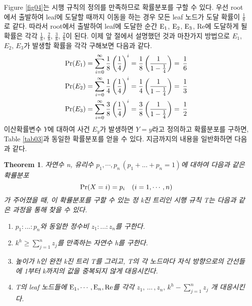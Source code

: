 \documentclass[11pt]{article}
\newtheorem{theorem}{Theorem}
\begin{document}
Figure \ref{fig04}는 시행 규칙의 정의를 만족하므로 확률분포를 구할 수 있다. 우선 root에서 출발하여 leaf에 도달할 때까지 이동을 하는 경우 모든 leaf 노드가 도달 확률이 $\frac{1}{8}$로 같다. 따라서 root에서 출발하여 leaf에 도달한 순간 $\textnormal{E}_{1}$, $\textnormal{E}_{2}$, $\textnormal{E}_{3}$, Re에 도달하게 될 확률은 각각 $\frac{1}{8}$, $\frac{2}{8}$, $\frac{3}{8}$, $\frac{2}{8}$이 된다. 이제 앞 절에서 설명했던 것과 마찬가지 방법으로 $E_{1}$, $E_{2}$, $E_{3}$가 발생할 확률을 각각 구해보면 다음과 같다.
\[
\begin{split}
\textnormal{Pr}(E_{1}) & = \sum_{i=0}^{\infty} \frac{1}{8}\left(\frac{1}{4}\right)^i = \frac{1}{8}\left(\frac{1}{1 - \frac{1}{4}}\right) = \,\frac{1}{6}\\
\textnormal{Pr}(E_{2}) & = \sum_{i=0}^{\infty} \frac{1}{4}\left(\frac{1}{4}\right)^i = \frac{1}{4}\left(\frac{1}{1 - \frac{1}{4}}\right) = \,\frac{1}{3}\\
\textnormal{Pr}(E_{3}) & = \sum_{i=0}^{\infty} \frac{3}{8}\left(\frac{1}{4}\right)^i = \frac{3}{8}\left(\frac{1}{1 - \frac{1}{4}}\right) = \,\frac{1}{2}
\end{split}
\]
이산확률변수 $Y$에 대하여 사건 $E_{y}$가 발생하면 $Y=y$라고 정의하고 확률분포를 구하면, Table \ref{tab03}과 동일한 확률분포를 얻을 수 있다. 지금까지의 내용을 일반화하면 다음과 같다.\\

\singlespacing
\begin{theorem}
자연수 n, 유리수 $p_{1}, \cdots, p_{n}\,(p_{1}+...+p_{n}=1)$에 대하여 다음과 같은 확률분포
\[\textnormal{Pr}(X = i) = p_{i} \quad(i = 1,\cdots, n)\]
가 주어졌을 때, 이 확률분포를 구할 수 있는 정 k진 트리인 시행 규칙 T는 다음과 같은 과정을 통해 찾을 수 있다.
\begin{enumerate}
    \item $p_{1}:...:p_{n}$와 동일한 정수비 $z_{1}:...:z_{n}$를 구한다.
    \item $k^{h} \ge \displaystyle \sum_{j=1}^{n} z_{j}$를 만족하는 자연수 h를 구한다.
    \item 높이가 h인 완전 k진 트리 T를 그리고, T의 각 노드마다 자식 방향으로의 간선들에 1부터 k까지의 값을 중복되지 않게 대응시킨다.
    \item T의 leaf 노드들에 $\textnormal{E}_1,\cdots,\textnormal{E}_n,\textnormal{Re}$를 각각 $z_{1},\,\dots\,,z_{n},\,k^{h}-\displaystyle \sum_{j=1}^{n}z_{j}$ 개 대응시킨다.
\end{enumerate}
\label{thm01}
\end{theorem}
\end{document}
